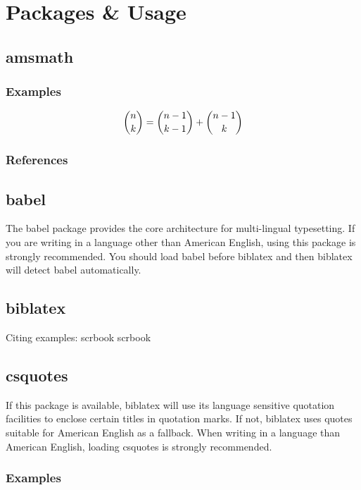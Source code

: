 \section{Packages \& Usage}
\subsection{amsmath}
\subsubsection{Examples}
$$\dbinom{n}{k} = \dbinom{n-1}{k-1} +\dbinom{n-1}{k}$$
\subsubsection{References}

\subsection{babel}
The babel package provides the core architecture for multi-lingual typesetting.
If you are writing in a language other than American English, using this package
is strongly recommended. You should load babel before biblatex and then biblatex
will detect babel automatically.

\subsection{biblatex}
Citing examples:
scrbook \autocite{KOH01}\newline
scrbook \autocite{TEXWELT01}

\subsection{csquotes}
If this package is available, biblatex will use its language sensitive quotation
facilities to enclose certain titles in quotation marks. If not, biblatex uses
quotes suitable for American English as a fallback. When writing in a language
than American English, loading csquotes is strongly recommended.

\subsubsection{Examples}
